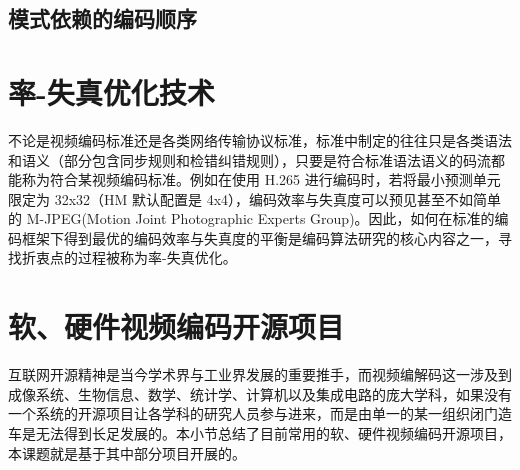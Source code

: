\subsection{模式依赖的编码顺序}

\section{率-失真优化技术}
不论是视频编码标准还是各类网络传输协议标准，标准中制定的往往只是各类语法和语义（部分包含同步规则和检错纠错规则），只要是符合标准语法语义的码流都能称为符合某视频编码标准。例如在使用 H.265 进行编码时，若将最小预测单元限定为 32x32（HM 默认配置是 4x4），编码效率与失真度可以预见甚至不如简单的 M-JPEG(Motion Joint Photographic Experts Group)。因此，如何在标准的编码框架下得到最优的编码效率与失真度的平衡是编码算法研究的核心内容之一，寻找折衷点的过程被称为率-失真优化。

\section{软、硬件视频编码开源项目}
互联网开源精神是当今学术界与工业界发展的重要推手，而视频编解码这一涉及到成像系统、生物信息、数学、统计学、计算机以及集成电路的庞大学科，如果没有一个系统的开源项目让各学科的研究人员参与进来，而是由单一的某一组织闭门造车是无法得到长足发展的。本小节总结了目前常用的软、硬件视频编码开源项目，本课题就是基于其中部分项目开展的。
